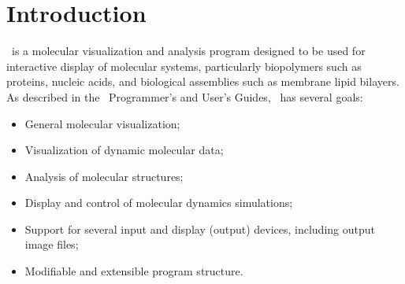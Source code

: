 
%
%
%

\chapter{Introduction}
\label{chapter:ig:intro}

\VMD\ is a molecular visualization and analysis program designed to
be used for interactive display of molecular systems, particularly
biopolymers such as proteins, nucleic acids, and biological
assemblies such as membrane lipid bilayers.  As described in the
\VMD\ Programmer's and User's Guides, \VMD\ has several goals:
\begin{itemize}
  \item General molecular visualization;
  \item Visualization of dynamic molecular data;
  \item Analysis of molecular structures;
  \item Display and control of molecular dynamics simulations;
  \item Support for several input and display (output) devices,
       including output image files;
  \item Modifiable and extensible program structure.
\end{itemize}

